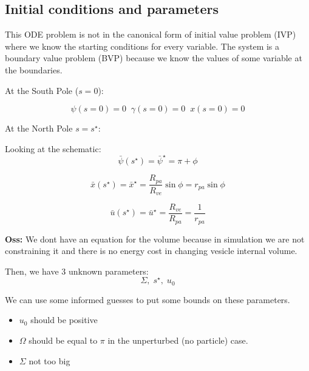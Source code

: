 \documentclass[12pt]{article}
\begin{document}




\subsection{Initial conditions and parameters}
This ODE problem is not in the canonical form of initial value problem (IVP) where we know the starting conditions for every variable. The system is a boundary value problem (BVP) because we know the values of some variable at the boundaries.

At the South Pole ($s=0$):


$$
\psi(s=0)=0 \; \; \gamma(s=0)=0 \; \; x(s=0) = 0
$$

At the North Pole $s=s^\star$:

Looking at the schematic:
$$
\bar{\psi}(s^\star) = \bar{\psi}^\star = \pi + \phi
$$


$$
\bar{x}(s^\star) = \bar{x}^\star =\frac{R_{pa}}{R_{ve}} \sin \phi = r_{pa} \sin \phi
$$

$$
\bar{u}(s^\star) = \bar{u}^\star = \frac{R_{ve}}{R_{pa}} = \frac{1}{r_{pa}}
$$




\textbf{Oss:} We dont have an equation for the volume because in simulation we are not constraining it and there is no energy cost in changing vesicle internal volume. 


Then, we have 3 unknown parameters:
$$\Sigma,\; s^\star ,\;u_0$$

We can use some informed guesses to put some bounds on these parameters. 
\begin{itemize}
  \item $u_0$ should be positive
  \item $\Omega$ should be equal to $\pi$ in the unperturbed (no particle) case.
  \item $\Sigma$ not too big
\end{itemize}
\end{document}
